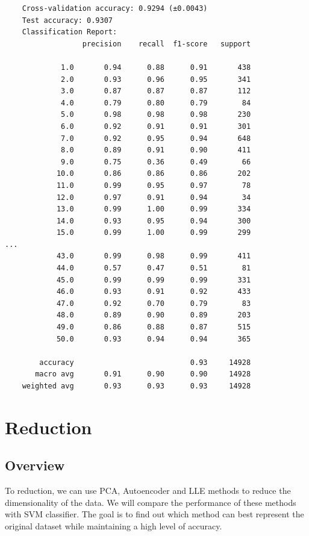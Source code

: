 \documentclass[lang=cn]{elegantpaper}
\begin{document}
\begin{lstlisting}
    Cross-validation accuracy: 0.9294 (±0.0043)
    Test accuracy: 0.9307
    Classification Report:
                  precision    recall  f1-score   support
    
             1.0       0.94      0.88      0.91       438
             2.0       0.93      0.96      0.95       341
             3.0       0.87      0.87      0.87       112
             4.0       0.79      0.80      0.79        84
             5.0       0.98      0.98      0.98       230
             6.0       0.92      0.91      0.91       301
             7.0       0.92      0.95      0.94       648
             8.0       0.89      0.91      0.90       411
             9.0       0.75      0.36      0.49        66
            10.0       0.86      0.86      0.86       202
            11.0       0.99      0.95      0.97        78
            12.0       0.97      0.91      0.94        34
            13.0       0.99      1.00      0.99       334
            14.0       0.93      0.95      0.94       300
            15.0       0.99      1.00      0.99       299
...
            43.0       0.99      0.98      0.99       411
            44.0       0.57      0.47      0.51        81
            45.0       0.99      0.99      0.99       331
            46.0       0.93      0.91      0.92       433
            47.0       0.92      0.70      0.79        83
            48.0       0.89      0.90      0.89       203
            49.0       0.86      0.88      0.87       515
            50.0       0.93      0.94      0.94       365
    
        accuracy                           0.93     14928
       macro avg       0.91      0.90      0.90     14928
    weighted avg       0.93      0.93      0.93     14928
\end{lstlisting}

\section{Reduction}

\subsection{Overview}

To reduction, we can use PCA, Autoencoder and LLE methods to reduce the dimensionality of the data. We will compare the performance of these methods with SVM classifier. The goal is to find out which method can best represent the original dataset while maintaining a high level of accuracy.
\end{document}
